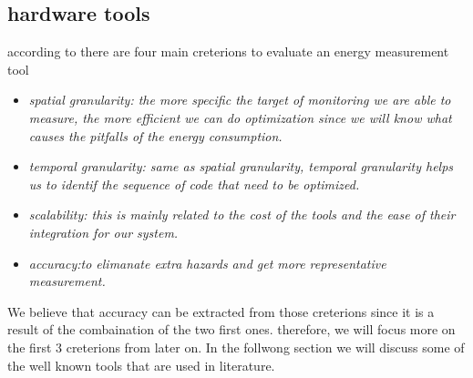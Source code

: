 \subsection{hardware tools}


according to \citeauthor{hackenberg2014hdeem} there are four main creterions to evaluate an energy measurement tool \cite{hackenberg2014hdeem}
\begin{itemize}
    \item \em{spatial granularity}: the more specific the target of monitoring we are able to measure, the more efficient we can do optimization since we will know what causes the pitfalls of the energy consumption.
    \item \em{temporal granularity}: same as spatial granularity, temporal granularity helps us to identif the sequence of code that need to be optimized.
    \item \em{scalability}: this is mainly related to the cost of the tools and the ease of their integration for our system.
    \item  \em{accuracy}:to elimanate extra hazards and get more representative measurement.
\end{itemize}

We believe that accuracy can be extracted from those creterions since it is a result of the combaination of the two first ones. therefore, we will focus more on the first 3 creterions from later on.
In the follwong section we will discuss some of the well known tools that are used in literature.


